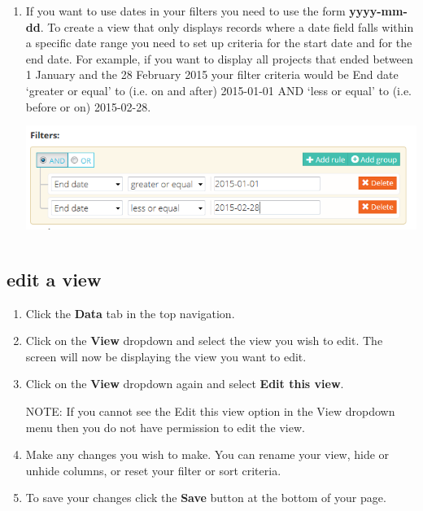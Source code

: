 \documentclass{ctrlo-int-toc}
\begin{document}
\begin{enumerate}
\item If you want to use dates in your filters you need to use the form \textbf{yyyy-mm-dd}. To create a view that only displays records where a date field falls within a specific date range you need to set up criteria for the start date and for the end date. \newline
For example, if you want to display all projects that ended between 1 January and the 28 February 2015 your filter criteria would be End date `greater or equal' to (i.e. on and after) 2015-01-01 AND `less or equal' to (i.e. before or on) 2015-02-28.\newline
\includegraphics[width=15.24cm,height=4.064cm]{userguide-img/userguide-img006.png}
 
\end{enumerate}

\subsection[edit a view]{edit a view}
\begin{enumerate}
\item Click the \textbf{Data} tab in the top navigation.
\item Click on the \textbf{View} dropdown and select the view you wish to edit. The screen will now be displaying the view you want to edit.
\item Click on the \textbf{View} dropdown again and select \textbf{Edit this view}.
\begin{notebox}
NOTE: If you cannot see the Edit this view option in the View dropdown menu then you do not have permission to edit the view. \ 
\end{notebox}

\item Make any changes you wish to make. You can rename your view, hide or unhide columns, or reset your filter or sort criteria. 
\item To save your changes click the \textbf{Save} button at the bottom of your page. 
\end{enumerate}
\end{document}
